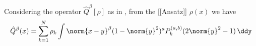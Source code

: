 Considering the operator $\hat{Q}^\beta[\rho]$ as in , from the [[Ansatz]] $\rho(x)$ we have
$$\hat{Q}^{\beta}(x) = \sum_{k=1}^{N} \rho_{k} \int \norm{x-y}^{\beta}(1-\norm{y}^2)^{a}P_{k}^{(a, b)}(2\norm{y}^{2}- 1) \,\ddy$$
